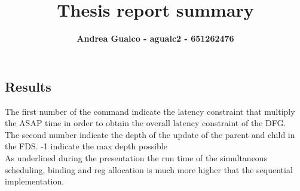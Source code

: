 \documentclass[a4paper, 11pt, oneside]{article}
\title{\textbf{Thesis report summary}}
\author{\textbf{Andrea Gualco - agualc2 - 651262476}}
\begin{document}
\begin{landscape}
\section{Results}
The first number of the command indicate the latency constraint that multiply the ASAP time in order to obtain
the overall latency constraint of the DFG.\\
The second number indicate the depth of the update of the parent and child in the FDS. -1 indicate the max depth possible\\
As underlined during the presentation the run time of the simultaneous scheduling, binding and reg allocation is much more
higher that the sequential implementation.


\end{landscape}
\end{document}
